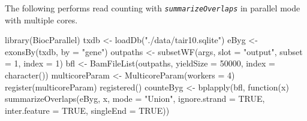\documentclass[14pt,]{article}
\newcommand{\hlnum}[1]{\textcolor[rgb]{0.816,0.125,0.439}{#1}}%
\newcommand{\hlstr}[1]{\textcolor[rgb]{0.251,0.627,0.251}{#1}}%
\newcommand{\hlstd}[1]{\textcolor[rgb]{0.251,0.251,0.251}{#1}}%
\newcommand{\hlkwd}[1]{\textcolor[rgb]{0.878,0.439,0.125}{#1}}%
\newenvironment{Shaded}{\begin{myshaded}}{\end{myshaded}}
\newcommand{\DecValTok}[1]{\hlnum{#1}}
\newcommand{\ConstantTok}[1]{\hlnum{#1}}
\newcommand{\StringTok}[1]{\hlstr{#1}}
\newcommand{\OtherTok}[1]{{#1}}
\newcommand{\FunctionTok}[1]{\hlstd{#1}}
\newcommand{\ControlFlowTok}[1]{\hlkwd{#1}}
\newcommand{\AttributeTok}[1]{{#1}}
\newcommand{\NormalTok}[1]{\hlstd{#1}}
\begin{document}
The following performs read counting with \emph{\texttt{summarizeOverlaps}} in parallel mode with multiple cores.

\begin{Shaded}
\begin{Highlighting}[]
\FunctionTok{library}\NormalTok{(BiocParallel)}
\NormalTok{txdb }\OtherTok{\textless{}{-}} \FunctionTok{loadDb}\NormalTok{(}\StringTok{"./data/tair10.sqlite"}\NormalTok{)}
\NormalTok{eByg }\OtherTok{\textless{}{-}} \FunctionTok{exonsBy}\NormalTok{(txdb, }\AttributeTok{by =} \StringTok{"gene"}\NormalTok{)}
\NormalTok{outpaths }\OtherTok{\textless{}{-}} \FunctionTok{subsetWF}\NormalTok{(args, }\AttributeTok{slot =} \StringTok{"output"}\NormalTok{, }\AttributeTok{subset =} \DecValTok{1}\NormalTok{, }\AttributeTok{index =} \DecValTok{1}\NormalTok{)}
\NormalTok{bfl }\OtherTok{\textless{}{-}} \FunctionTok{BamFileList}\NormalTok{(outpaths, }\AttributeTok{yieldSize =} \DecValTok{50000}\NormalTok{, }\AttributeTok{index =} \FunctionTok{character}\NormalTok{())}
\NormalTok{multicoreParam }\OtherTok{\textless{}{-}} \FunctionTok{MulticoreParam}\NormalTok{(}\AttributeTok{workers =} \DecValTok{4}\NormalTok{)}
\FunctionTok{register}\NormalTok{(multicoreParam)}
\FunctionTok{registered}\NormalTok{()}
\NormalTok{counteByg }\OtherTok{\textless{}{-}} \FunctionTok{bplapply}\NormalTok{(bfl, }\ControlFlowTok{function}\NormalTok{(x) }\FunctionTok{summarizeOverlaps}\NormalTok{(eByg, x, }\AttributeTok{mode =} \StringTok{"Union"}\NormalTok{, }
    \AttributeTok{ignore.strand =} \ConstantTok{TRUE}\NormalTok{, }\AttributeTok{inter.feature =} \ConstantTok{TRUE}\NormalTok{, }\AttributeTok{singleEnd =} \ConstantTok{TRUE}\NormalTok{))}


\end{Highlighting}
\end{Shaded}
\end{document}
